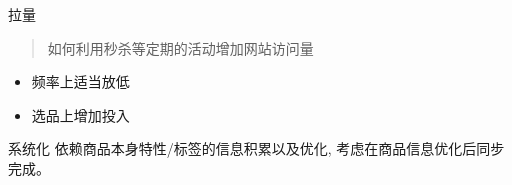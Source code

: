 \documentclass[presentation,bigger]{beamer}
\begin{document}
\begin{frame}[label={sec:orgheadline9}]{拉量}
\begin{quote}
如何利用秒杀等定期的活动增加网站访问量
\end{quote}
\begin{itemize}
\item 频率上适当放低
\item 选品上增加投入
\end{itemize}
\end{frame}

\begin{frame}[label={sec:orgheadline10}]{系统化}
依赖商品本身特性/标签的信息积累以及优化, 考虑在商品信息优化后同步完成。
\end{frame}
\end{document}
